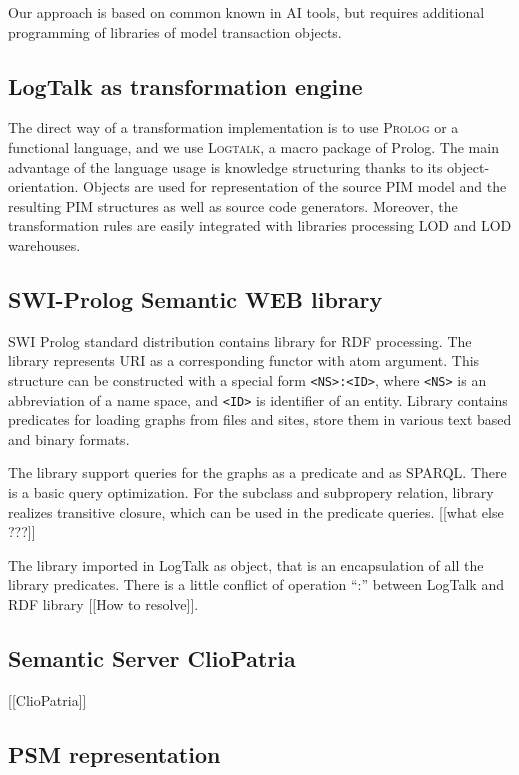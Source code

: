 \documentclass[conference]{IEEEtran}
\begin{document}
Our approach is based on common known in AI tools, but requires additional programming of libraries of model transaction objects.

\subsection{LogTalk as transformation engine}
\label{sec:logtalk-engine}

The direct way of a transformation implementation is to use \textsc{Prolog} or a functional language, and we use \textsc{Logtalk}, a macro package of Prolog.  The main advantage of the language usage is knowledge structuring thanks to its object-orientation.  Objects are used for representation of the source PIM model and the resulting PIM structures as well as source code generators.  Moreover, the transformation rules are easily integrated with libraries processing LOD and LOD warehouses.


\subsection{SWI-Prolog Semantic WEB library}
\label{sec:swi-sw}

SWI Prolog standard distribution contains library for RDF processing.  The library represents URI as a corresponding functor with atom argument. This structure can be constructed with a special form \texttt{<NS>:<ID>}, where \texttt{<NS>} is an abbreviation of a name space, and \texttt{<ID>} is identifier of an entity.  Library contains predicates for loading graphs from files and sites, store them in various text based and binary formats.

The library support queries for the graphs as a predicate and as SPARQL.  There is a basic query optimization.  For the subclass and subpropery relation, library realizes transitive closure, which can be used in the predicate queries.  [[what else ???]]

The library imported in LogTalk as object, that is an encapsulation of all the library predicates.  There is a little conflict of operation ``:'' between LogTalk and RDF library [[How to resolve]].

\subsection{Semantic Server ClioPatria}
\label{sec:clio-descr}
[[ClioPatria]]

\subsection{PSM representation}
\label{sec:blocks}
\end{document}
